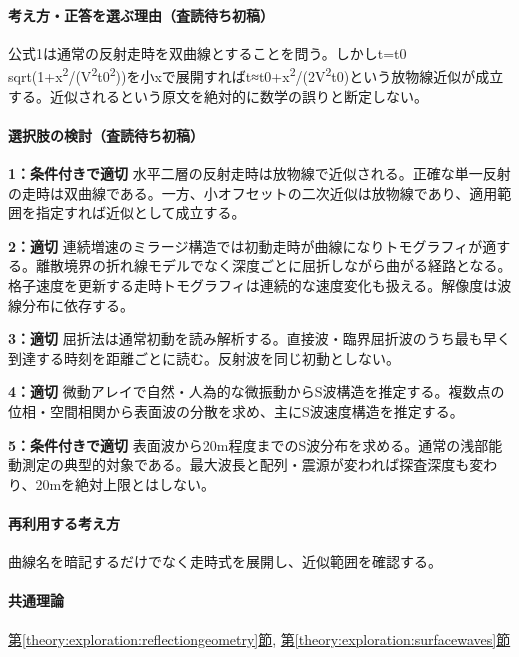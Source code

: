 \paragraph{考え方・正答を選ぶ理由（査読待ち初稿）} 公式1は通常の反射走時を双曲線とすることを問う。しかしt=\allowbreak{}t0 sqrt(1+x\textsuperscript{2}/(V\textsuperscript{2}t0\textsuperscript{2}))を小xで展開すればt≈t0+x\textsuperscript{2}/(2V\textsuperscript{2}t0)という放物線近似が成立する。近似されるという原文を絶対的に数学の誤りと断定しない。

\paragraph{選択肢の検討（査読待ち初稿）}\mbox{}\par

\noindent\textbf{1：条件付きで適切} 水平二層の反射走時は放物線で近似される。正確な単一反射の走時は双曲線である。一方、小オフセットの二次近似は放物線であり、適用範囲を指定すれば近似として成立する。\par

\noindent\textbf{2：適切} 連続増速のミラージ構造では初動走時が曲線になりトモグラフィが適する。離散境界の折れ線モデルでなく深度ごとに屈折しながら曲がる経路となる。格子速度を更新する走時トモグラフィは連続的な速度変化も扱える。解像度は波線分布に依存する。\par

\noindent\textbf{3：適切} 屈折法は通常初動を読み解析する。直接波・臨界屈折波のうち最も早く到達する時刻を距離ごとに読む。反射波を同じ初動としない。\par

\noindent\textbf{4：適切} 微動アレイで自然・人為的な微振動からS波構造を推定する。複数点の位相・空間相関から表面波の分散を求め、主にS波速度構造を推定する。\par

\noindent\textbf{5：条件付きで適切} 表面波から20m程度までのS波分布を求める。通常の浅部能動測定の典型的対象である。最大波長と配列・震源が変われば探査深度も変わり、20mを絶対上限とはしない。\par

\paragraph{再利用する考え方} 曲線名を暗記するだけでなく走時式を展開し、近似範囲を確認する。

\paragraph{共通理論} \hyperref[theory:exploration:reflectiongeometry]{第\ref*{theory:exploration:reflectiongeometry}節}, \hyperref[theory:exploration:surfacewaves]{第\ref*{theory:exploration:surfacewaves}節}

